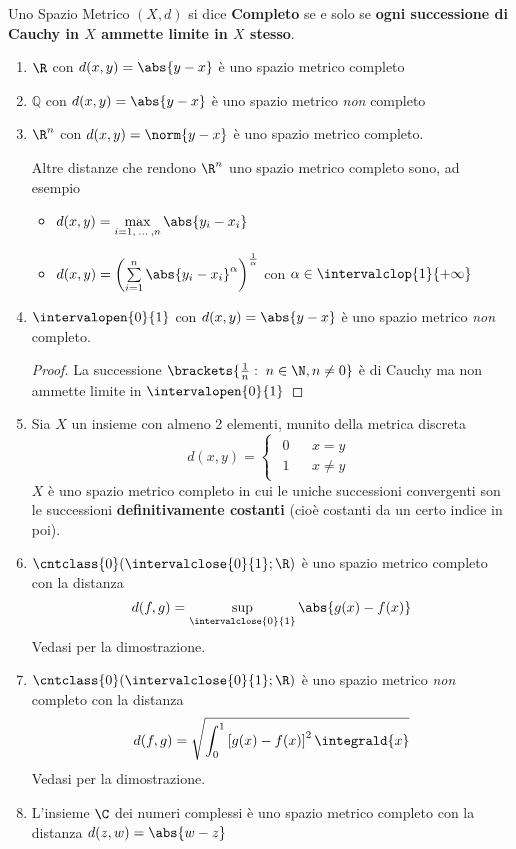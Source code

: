 \begin{definition}
	\label{def:completo}
	Uno Spazio Metrico $(X,d)$ si dice \textbf{Completo} se e solo se \textbf{ogni successione di Cauchy in $X$ ammette limite in $X$ stesso}.
\end{definition}
\begin{example}\leavevmode\vspace*{-\baselineskip}
	\label{ex:sp_metr_compl_e_non}
	\begin{enumerate}
		\item $\R$ con $d(x,y) = \abs{y - x}$ è uno spazio metrico completo
		\item $\mathbb{Q}$ con $d(x,y) = \abs{y - x}$ è uno spazio metrico \textit{non} completo
		\item $\R^n$ con $d(x,y) = \norm{y - x}$ è uno spazio metrico completo.
			\begin{note}
				Altre distanze che rendono $\R^n$ uno spazio metrico completo sono, ad esempio
				\begin{itemize}[nolistsep]
					\item $d(x,y) = \max\limits_{i=1,\:\dotsc\:,n} \abs{y_i - x_i}$
					\item $d(x,y) = \left( \sum\limits_{i=1}^{n} \abs{y_i - x_i}^\alpha \right)^{\frac{1}{\alpha}}$ con $\alpha \in \intervalclop{1}{+\infty}$
				\end{itemize}
			\end{note}
		\item $\intervalopen{0}{1}$ con $d(x,y) = \abs{y - x}$ è uno spazio metrico \textit{non} completo.
			\begin{proof}
				La successione $\brackets{\frac{1}{n}:\; n \in \N, n \neq 0}$ è di Cauchy ma non ammette limite in $\intervalopen{0}{1}$
			\end{proof}
		\item Sia $X$ un insieme con almeno 2 elementi, munito della metrica discreta
			\[d(x,y)=
			\begin{cases}
				\begin{matrix}
					0&&x=y\\
					1&&x \ne y
				\end{matrix}
			\end{cases}\]
			$X$ è uno spazio metrico completo in cui le uniche successioni convergenti son le successioni \textbf{definitivamente costanti} (cioè costanti da un certo indice in poi).
		\item $\cntclass{0}(\intervalclose{0}{1}; \R)$ è uno spazio metrico completo con la distanza
			\[d(f,g) = \sup\limits_{\intervalclose{0}{1}}\abs{g(x) - f(x)}\]
			Vedasi  per la dimostrazione.
		\item $\cntclass{0}(\intervalclose{0}{1}; \R)$ è uno spazio metrico \textit{non} completo con la distanza
			\[d(f,g) = \sqrt{\int_0^1 \left[ g(x) - f(x) \right]^2 \integrald{x}}\]
			Vedasi  per la dimostrazione.
		\item L'insieme $\C$ dei numeri complessi è uno spazio metrico completo con la distanza $d(z,w) = \abs{w-z}$
	\end{enumerate}
\end{example}
